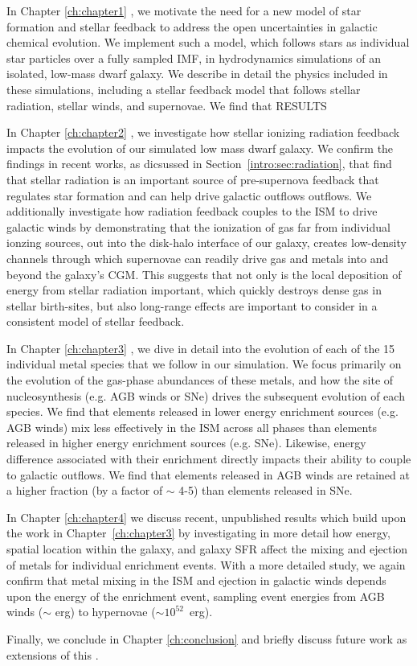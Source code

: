 In Chapter \ref{ch:chapter1} \citep[published as ][]{Emerick2019}, we motivate the need for a new model of star formation and stellar feedback to address the open uncertainties in galactic chemical evolution. We implement such a model, which follows stars as individual star particles over a fully sampled IMF, in hydrodynamics simulations of an isolated, low-mass dwarf galaxy. We describe in detail the physics included in these simulations, including a stellar feedback model that follows stellar radiation, stellar winds, and supernovae. We find that RESULTS

In Chapter \ref{ch:chapter2} \citep[published as ][]{Emerick2018a}, we investigate how stellar ionizing radiation feedback impacts the evolution of our simulated low mass dwarf galaxy. We confirm the findings in recent works, as dicsussed in Section~\ref{intro:sec:radiation}, that find that stellar radiation is an important source of pre-supernova feedback that regulates star formation and can help drive galactic outflows outflows. We additionally investigate how radiation feedback couples to the ISM to drive galactic winds by demonstrating that the ionization of gas far from individual ionzing sources, out into the disk-halo interface of our galaxy, creates low-density channels through which supernovae can readily drive gas and metals into and beyond the galaxy's CGM. This suggests that not only is the local deposition of energy from stellar radiation important, which quickly destroys dense gas in stellar birth-sites, but also long-range effects are important to consider in a consistent model of stellar feedback.

In Chapter \ref{ch:chapter3} \citep[published as ][]{Emerick2018b}, we dive in detail into the evolution of each of the 15 individual metal species that we follow in our simulation. We focus primarily on the evolution of the gas-phase abundances of these metals, and how the site of nucleosynthesis (e.g. AGB winds or SNe) drives the subsequent evolution of each species. We find that elements released in lower energy enrichment sources (e.g. AGB winds) mix less effectively in the ISM across all phases than elements released in higher energy enrichment sources (e.g. SNe). Likewise, energy difference associated with their enrichment directly impacts their ability to couple to galactic outflows. We find that elements released in AGB winds are retained at a higher fraction (by a factor of $\sim$ 4-5) than elements released in SNe.

In Chapter \ref{ch:chapter4} we discuss recent, unpublished results which build upon the work in Chapter~\ref{ch:chapter3} by investigating in more detail how energy, spatial location within the galaxy, and galaxy SFR affect the mixing and ejection of metals for individual enrichment events. With a more detailed study, we again confirm that metal mixing in the ISM and ejection in galactic winds depends upon the energy of the enrichment event, sampling event energies from AGB winds ($\sim$ erg) to hypernovae ($\sim 10^{52}$~erg).

Finally, we conclude in Chapter \ref{ch:conclusion} and briefly discuss future work as extensions of this \dissertation.
